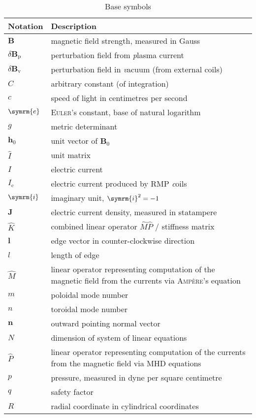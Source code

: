 \documentclass[a4paper, twoside, 10pt, english]{article}
\numberwithin{equation}{section}
\let\vec\symbf
\newcommand*\e{\ensuremath{\symrm{e}}}  %
\newcommand*\im{\ensuremath{\symrm{i}}}  %
\newcommand*\Bvac{\ensuremath{\delta \vec{B}_{\text{v}}}}  %
\newcommand*\Bplas{\ensuremath{\delta \vec{B}_{\text{p}}}}  %
\begin{document}
\begin{longtable}{l >{\RaggedRight}p{}}
  \caption{Base symbols} \\
  \toprule
  \textbf{Notation} & \textbf{Description} \\
  \midrule
  \endhead
  \label{tab:symbols}%
  $\vec{B}$ & magnetic field strength, measured in Gauss \\
  $\Bplas$ & perturbation field from \emph{p}lasma current \\
  $\Bvac$ & perturbation field in \emph{v}acuum (from external coils) \\
  $C$ & arbitrary constant (of integration) \\
  $c$ & speed of light in centimetres per second \\
  $\e$ & \textsc{Euler}'s constant, base of natural logarithm \\
  $g$ & metric determinant \\
  $\vec{h}_{0}$ & unit vector of $\vec{B}_{0}$ \\
  $\hat{I}$ & unit matrix \\
  $I$ & electric current \\
  $I_{\text{c}}$ & electric current produced by RMP \emph{c}oils \\
  $\im$ & imaginary unit, $\im^{2} = -1$ \\
  $\vec{J}$ & electric current density, measured in statampere \\
  $\hat{K}$ & combined linear operator $\hat{M} \hat{P}$ / stiffness matrix \\
  $\vec{l}$ & edge vector in counter-clockwise direction \\
  $l$ & length of edge \\
  $\hat{M}$ & linear operator representing computation of the magnetic field from the currents via \textsc{Ampère}'s equation \\
  $m$ & poloidal mode number \\
  $n$ & toroidal mode number \\
  $\vec{n}$ & outward pointing normal vector \\
  $N$ & dimension of system of linear equations \\
  $\hat{P}$ & linear operator representing computation of the currents from the magnetic field via MHD equations \\
  $p$ & pressure, measured in dyne per square centimetre \\
  $q$ & safety factor \\
  $R$ & radial coordinate in cylindrical coordinates \\

\end{longtable}
\end{document}
